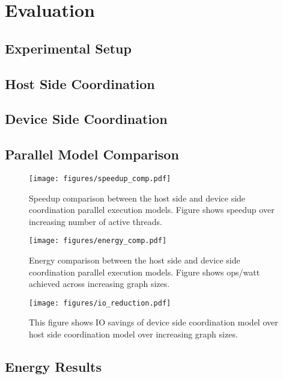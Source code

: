 
\section{Evaluation} \label{sec:eval}

\subsection{Experimental Setup}

\subsection{Host Side Coordination}

\subsection{Device Side Coordination}

\subsection{Parallel Model Comparison}

\begin{figure}[t]
	\centering
	\texttt{[image: figures/speedup\_comp.pdf]}
	\caption{Speedup comparison between the host side and device side coordination parallel execution models. Figure shows speedup over increasing number of active threads.}
    \label{fig:speedup_comp}
\end{figure}

\begin{figure}[t]
	\centering
	\texttt{[image: figures/energy\_comp.pdf]}
	\caption{Energy comparison between the host side and device side coordination parallel execution models. Figure shows ops/watt achieved across increasing graph sizes.}
	\label{fig:energy_comp}
\end{figure}

\begin{figure}[t]
	\centering
	\texttt{[image: figures/io\_reduction.pdf]}
	\caption{This figure shows IO savings of device side coordination model over host side coordination model over increasing graph sizes.}
	\label{fig:ioreduction}
\end{figure}



\subsection{Energy Results}
